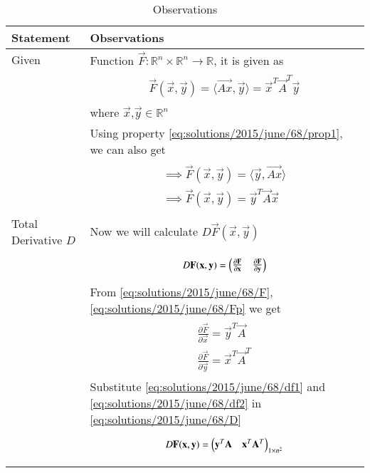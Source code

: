 \begin{longtable}{|l|l|}
\hline
\endhead
\textbf{Statement}&\textbf{Observations}\\
\hline
Given&Function $\vec{F}:\mathbb{R}^n\times\mathbb{R}^n\rightarrow\mathbb{R}$, it is given as\\&\parbox{13cm}{\begin{align}
    \vec{F}(\vec{x},\vec{y})=\langle\vec{Ax},\vec{y}\rangle=\vec{x}^T\vec{A}^T\vec{y}\label{eq:solutions/2015/june/68/F}
\end{align}}\\&where $\vec{x}$,$\vec{y}\in\mathbb{R}^n$\\&Using property \eqref{eq:solutions/2015/june/68/prop1}, we can also get\\&\parbox{13cm}{\begin{align}
    \implies\vec{F}(\vec{x},\vec{y})=\langle\vec{y},\vec{Ax}\rangle\\
    \implies\vec{F}(\vec{x},\vec{y})=\vec{y}^T\vec{A}\vec{x}\label{eq:solutions/2015/june/68/Fp}
\end{align}}\\
\hline
Total Derivative $D$&Now we will calculate $D\vec{F}(\vec{x},\vec{y})$\\&\parbox{13cm}{\begin{align}
    D\mathbf{F}(\mathbf{x},\mathbf{y})=\begin{pmatrix}\frac{\partial \mathbf{F}}{\partial \mathbf{x}}&\frac{\partial \mathbf{F}}{\partial \mathbf{y}}\end{pmatrix}\label{eq:solutions/2015/june/68/D}
\end{align}}\\&From \eqref{eq:solutions/2015/june/68/F},\eqref{eq:solutions/2015/june/68/Fp} we get\\&\parbox{13cm}{\begin{align}
    \frac{\partial \vec{F}}{\partial \vec{x}}=\vec{y}^T\vec{A}\label{eq:solutions/2015/june/68/df1}\\
    \frac{\partial \vec{F}}{\partial \vec{y}}=\vec{x}^T\vec{A}^T\label{eq:solutions/2015/june/68/df2}
\end{align}}\\&Substitute \eqref{eq:solutions/2015/june/68/df1} and \eqref{eq:solutions/2015/june/68/df2} in \eqref{eq:solutions/2015/june/68/D}\\&\parbox{13cm}{\begin{align}
    D\mathbf{F}(\mathbf{x},\mathbf{y})=\begin{pmatrix}\mathbf{y}^T\mathbf{A}&\mathbf{x}^T\mathbf{A}^T\end{pmatrix}_{1\times n^2}\label{eq:solutions/2015/june/68/Dsol}
\end{align}}\\
\hline
\caption{Observations}
\label{eq:solutions/2015/june/68/obs}
\end{longtable}

